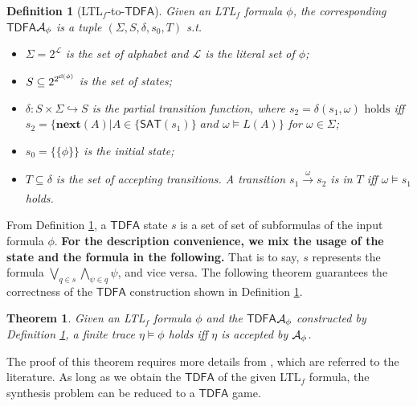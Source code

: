\documentclass[letterpaper]{article} %
\newcommand{\ltlf}{\textsf{LTL}$_f$\xspace}
\newtheorem{theorem}{Theorem}
\newtheorem{definition}{Definition}
\newcommand{\tran}[1]{\xrightarrow[]{#1}}
\def\tdfa{$\mathsf{TDFA}$\xspace}
\def\TDFA{$\mathsf{TDFA}$\xspace}
\def\SAT{\textsf{SAT}\xspace}
\newcommand{\cl}{{\sf cl}\xspace}
\begin{document}
\begin{definition}[\ltlf-to-\tdfa]\label{def:ltlf2dfa}
Given an \ltlf formula $\phi$, the corresponding \TDFA ${\mathcal{A}_{\phi}}$ is a tuple $(\Sigma, S, \delta, s_0, T)$ s.t.
\begin{itemize}
	\item $\Sigma = 2^{\mathcal{L}}$ is the set of alphabet and $\mathcal{L}$ is the literal set of $\phi$;
	\item $S\subseteq 2^{2^{\cl(\phi)}}$ is the set of states;
	\item $\delta:  S \times \Sigma \hookrightarrow S$ is the partial transition function, where $s_2 = \delta(s_1, \omega) \mbox{ holds}$ iff $s_2=\{\mathbf{next}(A) | A\in\{\SAT(s_1)\}\textit{ and }\omega \models L(A)\}$ for $\omega \in \Sigma$;
	\item $s_0 = \{\{\phi \}\}$ is the initial state;
	\item $T\subseteq \delta$ is the set of accepting transitions. A transition $s_1\tran{\omega}s_2$ is in $T$ iff $\omega\models s_1$ holds. 
\end{itemize}

\end{definition}

From Definition \ref{def:ltlf2dfa}, a \tdfa state $s$ is a set of set of subformulas of the input formula $\phi$. \textbf{For the description convenience, we mix the usage of the state and the formula in the following.} That is to say, $s$ represents the formula $\bigvee_{q\in s}\bigwedge_{\psi\in q} \psi$, and vice versa. The following theorem guarantees the correctness of the \tdfa construction shown in Definition \ref{def:ltlf2dfa}. 

\begin{theorem}\label{thm:ltlf2tdfa}
Given an \ltlf formula $\phi$ and the \tdfa ${\mathcal{A}_{\phi}}$ constructed by Definition \ref{def:ltlf2dfa}, a finite trace $\eta\models\phi$ holds iff $\eta$ is accepted by ${\mathcal{A}_{\phi}}$. 
\end{theorem}
The proof of this theorem requires more details from \cite{LRPZV19}, which are referred to the literature. %
As long as we obtain the \tdfa of the given \ltlf formula, the synthesis problem can be reduced to a \tdfa game.
\end{document}
